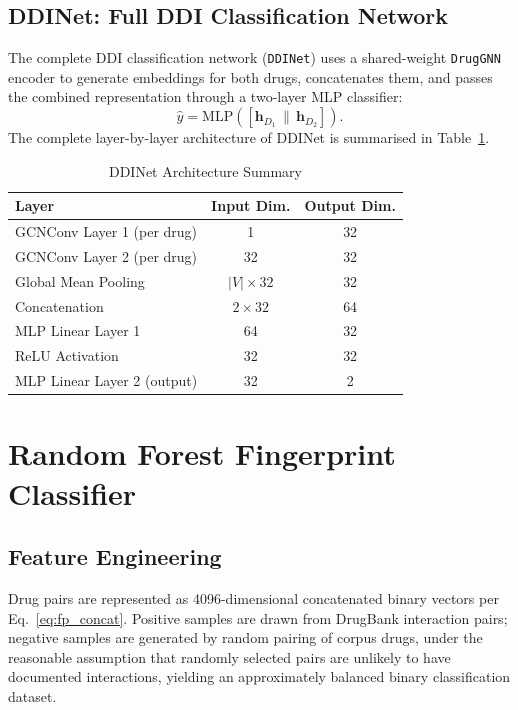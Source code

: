 \documentclass[12pt,a4paper,oneside]{report}
\begin{document}
\subsection{DDINet: Full DDI Classification Network}

The complete DDI classification network (\texttt{DDINet}) uses a shared-weight
\texttt{DrugGNN} encoder to generate embeddings for both drugs, concatenates them, and
passes the combined representation through a two-layer MLP classifier:
\begin{equation}
  \hat{y} = \mathrm{MLP}\!\left([\mathbf{h}_{D_1} \,\|\, \mathbf{h}_{D_2}]\right).
  \label{eq:ddinet}
\end{equation}
The complete layer-by-layer architecture of DDINet is summarised in
Table~\ref{tab:ddinet}.

\begin{table}[htbp]
\centering
\caption{DDINet Architecture Summary}
\label{tab:ddinet}
\begin{tabular}{lcc}
\toprule
\textbf{Layer} & \textbf{Input Dim.} & \textbf{Output Dim.} \\
\midrule
GCNConv Layer 1 (per drug) & 1              & 32 \\
GCNConv Layer 2 (per drug) & 32             & 32 \\
Global Mean Pooling        & $|V| \times 32$& 32 \\
Concatenation              & $2 \times 32$  & 64 \\
MLP Linear Layer 1         & 64             & 32 \\
ReLU Activation            & 32             & 32 \\
MLP Linear Layer 2 (output)& 32             & 2  \\
\bottomrule
\end{tabular}
\end{table}

\section{Random Forest Fingerprint Classifier}

\subsection{Feature Engineering}

Drug pairs are represented as 4096-dimensional concatenated binary vectors per
Eq.~\eqref{eq:fp_concat}. Positive samples are drawn from DrugBank interaction pairs;
negative samples are generated by random pairing of corpus drugs, under the reasonable
assumption that randomly selected pairs are unlikely to have documented interactions,
yielding an approximately balanced binary classification dataset.
\end{document}
